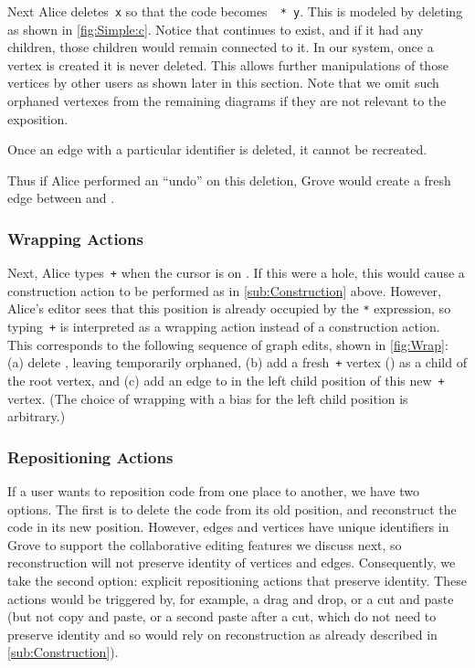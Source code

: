 
Next Alice deletes~\texttt{x} so that the code becomes~\texttt{\hole{} * y}.
This is modeled by deleting \eSimpleX{} as shown in \autoref{fig:Simple:c}.
Notice that \vSimpleX{} continues to exist, and if it had any children, those children would remain connected to it.
In our system, once a vertex is created it is never deleted.
This allows further manipulations of those vertices by other users as shown later in this section.
Note that we omit such orphaned vertexes from the remaining diagrams if they are not relevant to the exposition.

Once an edge with a particular identifier is deleted, it cannot be recreated.

Thus if Alice performed an ``undo'' on this deletion, Grove would create a fresh edge between \vSimpleTimes{} and \vSimpleX{}.

\subsubsection{Wrapping Actions}%
\label{sub:Wrapping}

Next, Alice types~\texttt{+} when the cursor is on \vSimpleTimes{}.
If this were a hole, this would cause a construction action to be performed as in \autoref{sub:Construction} above.
However, Alice's editor sees that this position is already occupied by the \texttt{*} expression,
so typing~\texttt{+} is interpreted as a wrapping action instead of a construction action.
This corresponds to the following sequence of graph edits, shown in \autoref{fig:Wrap}:
(a) delete \eSimpleTimes{}, leaving \vSimpleTimes{} temporarily orphaned,
(b) add a fresh~\texttt{+} vertex (\vWrapPlus{}) as a child of the root vertex, and
(c) add an edge to \vSimpleTimes{} in the left child position of this new~\texttt{+} vertex.
(The choice of wrapping with a bias for the left child position is arbitrary.)

\subsubsection{Repositioning Actions}%
\label{sub:Repositioning}

If a user wants to reposition code from one place to another, we have two options.
The first is to delete the code from its old position, and
reconstruct the code in its new position.
However, edges and vertices have unique identifiers in Grove
to support the collaborative editing features we discuss next,
so reconstruction will not preserve identity of vertices and edges.
Consequently, we take the second option: explicit repositioning actions that preserve identity.
These actions would be triggered by, for example, a drag and drop, or a cut and paste
(but not copy and paste, or a second paste after a cut, which do not need to
preserve identity and so would rely on reconstruction as already described in \autoref{sub:Construction}).

